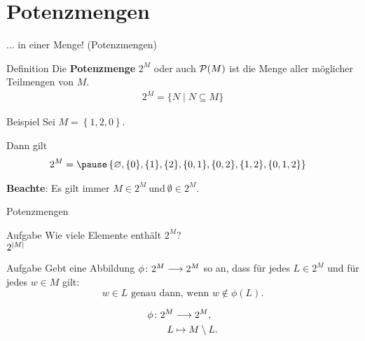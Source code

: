 \section{Potenzmengen}

\begin{frame}{... in einer Menge! (Potenzmengen)}
	\begin{block}{Definition}
		Die \textbf{Potenzmenge} $2^M$ oder auch $\mathcal{P} (M)$ ist die Menge aller möglicher Teilmengen von $M$. 
		\begin{align*}
			2^M = \{N \mid N \subseteq M\}
		\end{align*}
	\end{block}
	\pause
	
	\begin{block}{Beispiel}
		Sei $M = \left\{ 1,2,0 \right\} $. \\ \pause
		
		Dann gilt  
		\begin{align*}   
		2^M &= \pause \left\lbrace \emptyset, \{ 0 \}, \{ 1 \}, \{ 2 \}, \{ 0,1 \} , \{ 0,2 \}, \{ 1,2 \}, \{ 0,1,2 \} \right\rbrace
		\end{align*}
		
		\textbf{Beachte}: Es gilt immer $M \in 2^M \ \text{und} \ \emptyset \in 2^M$.
	\end{block}
	
\end{frame}

\begin{frame}{Potenzmengen}
	\begin{block}{Aufgabe}
		Wie viele Elemente enthält $2^M$? \\[0.5em]
		
		\pause
		$2^{\lvert M \rvert}$
	\end{block}
	
	\pause
	\begin{block}{Aufgabe}
		Gebt eine Abbildung $\phi \colon 2^{M} \longrightarrow 2^{M}$ so an,
		dass für jedes $L \in 2^{M}$ und für jedes $w \in M$ gilt:
		\begin{equation*}
			w \in L \text{ genau dann, wenn } w \notin \phi(L).
		\end{equation*}
		
		\pause
		\begin{align*}
			\phi \colon 2^{M} &\longrightarrow 2^{M},\\
			L &\mapsto M \setminus L.
		\end{align*}
	\end{block}

\end{frame}

